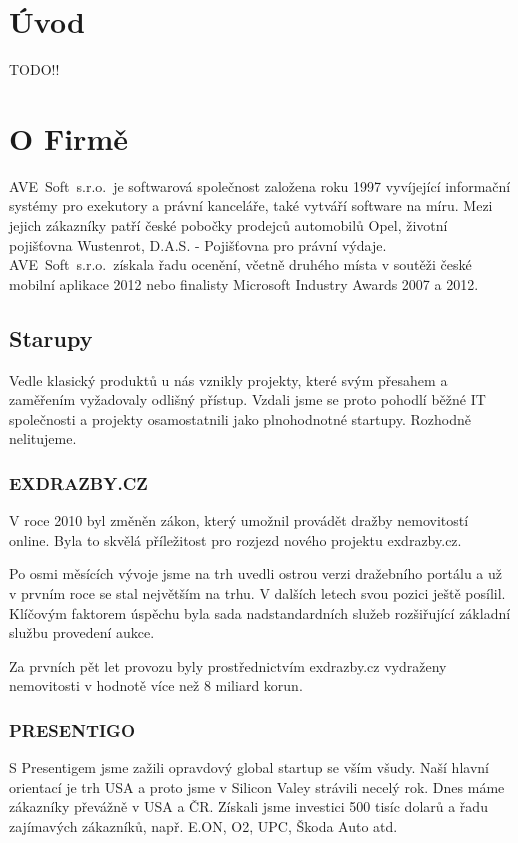 \documentclass[czech,bachelor,dept460,male,csharp]{diploma}
\newcommand{\AveSoft}{AVE~Soft~s.r.o.}
\begin{document}
\MakeTitlePages

\section{Úvod}
TODO!!

\section{O Firmě}
	\AveSoft\ je softwarová společnost založena roku 1997 vyvíjející informační systémy pro exekutory a právní kanceláře, také vytváří software na míru.
	Mezi jejich zákazníky patří české pobočky prodejců automobilů Opel, životní pojišťovna Wustenrot, D.A.S. - Pojišťovna pro právní výdaje.
	\AveSoft\ získala řadu ocenění, včetně druhého místa v soutěži české mobilní aplikace 2012 nebo finalisty Microsoft Industry Awards 2007 a 2012.
	\subsection{Starupy}
	Vedle klasický produktů u nás vznikly projekty, které svým přesahem a zaměřením vyžadovaly odlišný přístup. Vzdali jsme se proto pohodlí běžné IT společnosti a projekty osamostatnili jako plnohodnotné startupy. Rozhodně nelitujeme. 
 		\subsubsection{EXDRAZBY.CZ}
 		V roce 2010 byl změněn zákon, který umožnil provádět dražby nemovitostí online. Byla to skvělá příležitost pro rozjezd nového projektu exdrazby.cz.

		Po osmi měsících vývoje jsme na trh uvedli ostrou verzi dražebního portálu a už v prvním roce se stal největším na trhu. V dalších letech svou pozici ještě posílil. Klíčovým faktorem úspěchu byla sada nadstandardních služeb rozšiřující základní službu provedení aukce.

		Za prvních pět let provozu byly prostřednictvím exdrazby.cz vydraženy nemovitosti v hodnotě více než 8 miliard korun.
 		\subsubsection{PRESENTIGO}
 		S Presentigem jsme zažili opravdový global startup se vším všudy. Naší hlavní orientací je trh USA a proto jsme v  Silicon Valey strávili necelý rok. Dnes máme zákazníky převážně v USA a ČR. Získali jsme investici 500 tisíc dolarů a řadu zajímavých zákazníků, např. E.ON, O2, UPC, Škoda Auto atd.
\end{document}
